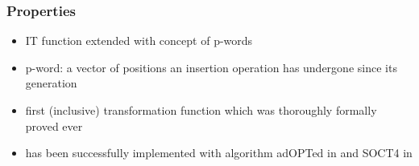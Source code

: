 \subsubsection{Properties}
\begin{itemize}
 \item IT function extended with concept of p-words
 \item p-word: a vector of positions an insertion operation has undergone since its generation
 \item first (inclusive) transformation function which was thoroughly formally proved ever
 \item has been successfully implemented with algorithm adOPTed in \cite{cicolini} and SOCT4 in \cite{mosi}
\end{itemize}
